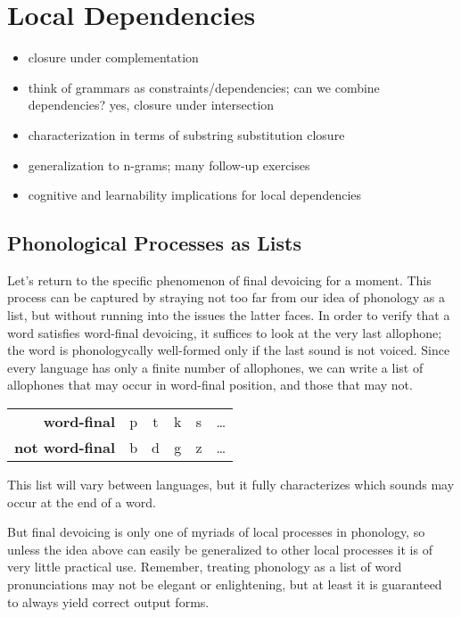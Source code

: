 \chapter{Local Dependencies}
\label{cha:SL}

\begin{itemize}
    \item closure under complementation
    \item think of grammars as constraints/dependencies; can we combine dependencies? yes, closure under intersection
    \item characterization in terms of substring substitution closure
    \item generalization to n-grams; many follow-up exercises
    \item cognitive and learnability implications for local dependencies
\end{itemize}

\section{Phonological Processes as Lists}
Let's return to the specific phenomenon of final devoicing for a moment.
This process can be captured by straying not too far from our idea of phonology as a list, but without running into the issues the latter faces.
In order to verify that a word satisfies word-final devoicing, it suffices to look at the very last allophone;
the word is phonologycally well-formed only if the last sound is not voiced.
Since every language has only a finite number of allophones, we can write a list of allophones that may occur in word-final position, and those that may not.
%
\begin{center}
    \begin{tabular}{r@{\hskip 2em}ccccc}
        \textbf{word-final}     & p & t & k & s & \ldots\\
        \textbf{not word-final} & b & d & g & z & \ldots
    \end{tabular}
\end{center}
%
This list will vary between languages, but it fully characterizes which sounds may occur at the end of a word.

But final devoicing is only one of myriads of local processes in phonology, so unless the idea above can easily be generalized to other local processes it is of very little practical use.
Remember, treating phonology as a list of word pronunciations may not be elegant or enlightening, but at least it is guaranteed to always yield correct output forms.

